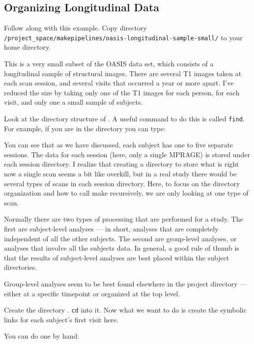 \subsection{Organizing Longitudinal Data}

Follow along with this example. Copy directory 
\newline\texttt{/project_space/makepipelines/oasis-longitudinal-sample-small/} \newline
to your home directory. 

This is a very small subset of the OASIS data set, which consists of a
longitudinal sample of structural images. There are several T1 images
taken at each scan session, and several visits that occurred a year or
more apart. I’ve reduced the size by taking only one of the T1 images
for each person, for each visit, and only one a small sample of
subjects.

Look at the directory structure of . A useful command to do this is called \texttt{find}. For example, if you are in the  directory you can type:

You can see that as we have discussed, each subject has one to five
separate sessions. The data for each session (here, only a single
MPRAGE) is stored under each session directory. I realize that
creating a directory to store what is right now a single scan seems a
bit like overkill, but in a real study there would be several types of
scans in each session directory. Here, to focus on the directory
organization and how to call make recursively, we are only looking at
one type of scan.

Normally there are two types of processing that are performed for a
study. The first are subject-level analyses --- in short, analyses that
are completely independent of all the other subjects. The second are
group-level analyses, or analyses that involve all the subjects
data. In general, a good rule of thumb is that the results of
subject-level analyses are best placed within the subject directories.

Group-level analyses seem to be best found elsewhere in the project
directory --- either at a specific timepoint or organized at the top
level.

Create the directory . \texttt{cd} into it. Now what we want to do is create the symbolic links for each subject's first visit here.

You can do one by hand:

